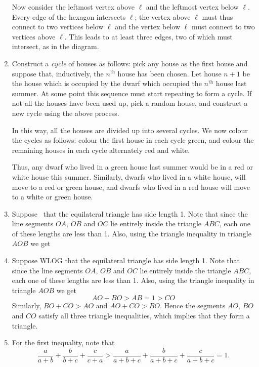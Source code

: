 \documentclass{article}
\begin{document}
\begin{enumerate}
Now consider the leftmost vertex above $\ell$ and the leftmost vertex below $\ell$. Every edge of the hexagon intersects $\ell$; the vertex above $\ell$ must thus connect to two vertices below $\ell$ and the vertex below $\ell$ must connect to two vertices above $\ell$. This leads to at least three edges, two of which must intersect, as in the diagram.

\centerline{}

\item Construct a \emph{cycle} of houses as follows: pick any house as the first house and suppose that, inductively, the $n^{\textrm{th}}$ house has been chosen. Let house $n+1$ be the house which is occupied by the dwarf which occupied the $n^{\textrm{th}}$ house last summer. At some point this sequence must start repeating to form a cycle. If not all the houses have been used up, pick a random house, and construct a new cycle using the above process. 

In this way, all the houses are divided up into several cycles. We now colour the cycles as follows: colour the first house in each cycle green, and colour the remaining houses in each cycle alternately red and white. 

Thus, any dwarf who lived in a green house last summer would be in a red or white house this summer. Similarly, dwarfs who lived in a white house, will move to a red or green house, and dwarfs who lived in a red house will move to a white or green house. 

\item Suppose \wlg\ that the equilateral triangle has side length 1. Note that since the line segments $OA$, $OB$ and $OC$ lie entirely inside the triangle $ABC$, each one of these lengths are less than 1. Also, using the triangle inequality in triangle $AOB$ we get 
\item Suppose WLOG that the equilateral triangle has side length 1. Note that since the line segments $OA$, $OB$ and $OC$ lie entirely inside the triangle $ABC$, each one of these lengths are less than 1. Also, using the triangle inequality in triangle $AOB$ we get 
$$AO+BO > AB = 1 > CO$$
Similarly, $BO + CO > AO$ and $AO+CO > BO$. Hence the segments $AO$, $BO$ and $CO$ satisfy all three triangle inequalities, which implies that they form a triangle.

\centerline{}

\item For the first inequality, note that 
$$\frac{a}{a+b} + \frac{b}{b+c} + \frac{c}{c+a} > \frac{a}{a+b+c} + \frac{b}{a+b+c}+\frac{c}{a+b+c}=1.$$


\end{enumerate}
\end{document}
